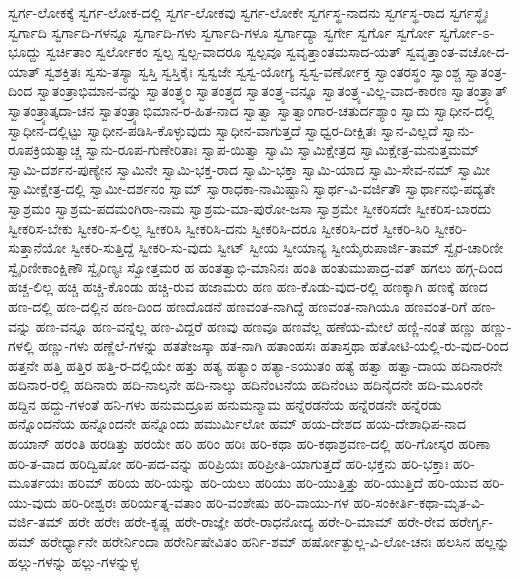 {ಸ್ವರ್ಗ-ಲೋಕಕ್ಕೆ
ಸ್ವರ್ಗ-ಲೋಕ-ದಲ್ಲಿ
ಸ್ವರ್ಗ-ಲೋಕವು
ಸ್ವರ್ಗ-ಲೋಕೇ
ಸ್ವರ್ಗಸ್ಥ-ನಾದನು
ಸ್ವರ್ಗಸ್ಥ-ರಾದ
ಸ್ವರ್ಗಸ್ಥೈಃ
ಸ್ವರ್ಗಾದಿ
ಸ್ವರ್ಗಾದಿ-ಗಳನ್ನೂ
ಸ್ವರ್ಗಾದಿ-ಗಳು
ಸ್ವರ್ಗಾದಿ-ಗಳೂ
ಸ್ವರ್ಗಾದ್ಯಾ
ಸ್ವರ್ಗೇ
ಸ್ವರ್ಗೊ
ಸ್ವರ್ಗೋ
ಸ್ವರ್ಗೋ-ಽ-ಭೂದ್ದು
ಸ್ವರ್ಚಿತಾಂ
ಸ್ವರ್ಲೋಕಂ
ಸ್ವಲ್ಪ
ಸ್ವಲ್ಪ-ವಾದರೂ
ಸ್ವಲ್ಪವೂ
ಸ್ವವೃತ್ತಾಂತಮಸಾದ-ಯತ್
ಸ್ವವೃತ್ತಾಂತ-ವಚೋ-ದ-ಯಾತ್
ಸ್ವಶಕ್ತಿತಃ
ಸ್ವಸು-ತಸ್ಯಾ
ಸ್ವಸ್ತಿ
ಸ್ವಸ್ತಿಕೈಃ
ಸ್ವಸ್ವಜೇ
ಸ್ವಸ್ವ-ಯೋಗ್ಯ
ಸ್ವಸ್ವ-ವರ್ಣೋಕ್ತ
ಸ್ವಾಂತರಸ್ಥಂ
ಸ್ವಾಂಶ್ಚ
ಸ್ವಾತಂತ್ರ-ದಿಂದ
ಸ್ವಾತಂತ್ರಾಭಿಮಾನ-ವನ್ನು
ಸ್ವಾತಂತ್ರ್ಯಂ
ಸ್ವಾತಂತ್ರ್ಯದ
ಸ್ವಾತಂತ್ರ್ಯ-ವನ್ನೂ
ಸ್ವಾತಂತ್ರ್ಯ-ವಿಲ್ಲ-ವಾದ-ಕಾರಣ
ಸ್ವಾತಂತ್ರ್ಯಾತ್
ಸ್ವಾತಂತ್ರ್ಯಾತ್ಕದಾ-ಚನ
ಸ್ವಾತಂತ್ರ್ಯಾಭಿಮಾನ-ರ-ಹಿತ-ನಾದ
ಸ್ವಾತ್ವಾ
ಸ್ವಾತ್ವಾಂಗಾರ-ಚತುರ್ದಶ್ಯಾಂ
ಸ್ವಾದು
ಸ್ವಾಧೀನ-ದಲ್ಲಿ
ಸ್ವಾಧೀನ-ದಲ್ಲಿಟ್ಟು
ಸ್ವಾಧೀನ-ಪಡಿಸಿ-ಕೊಳ್ಳುವುದು
ಸ್ವಾಧೀನ-ವಾಗುತ್ತದೆ
ಸ್ವಾಧ್ವರ-ದೀಕ್ಷಿತಃ
ಸ್ವಾನ-ವಿಲ್ಲದೆ
ಸ್ವಾನು-ರೂಪಕ್ರಿಯತ್ವಾಚ್ಚ
ಸ್ವಾನು-ರೂಪ-ಗುಣೇರಿತಾಃ
ಸ್ವಾಪ-ಯಿತ್ವಾ
ಸ್ವಾಮಿ
ಸ್ವಾಮಿಕ್ಷೇತ್ರದ
ಸ್ವಾಮಿಕ್ಷೇತ್ರ-ಮನುತ್ತಮಮ್
ಸ್ವಾಮಿ-ದರ್ಶನ-ಪುಣ್ಯೇನ
ಸ್ವಾಮಿನೇ
ಸ್ವಾಮಿ-ಭಕ್ತ-ರಾದ
ಸ್ವಾಮಿ-ಭಕ್ತಾ
ಸ್ವಾಮಿ-ಯಾದ
ಸ್ವಾಮಿ-ಸೇವ-ನಮ್
ಸ್ವಾಮೀ
ಸ್ವಾಮೀಕ್ಷೇತ್ರ-ದಲ್ಲಿ
ಸ್ವಾಮೀ-ದರ್ಶನಂ
ಸ್ವಾಮ್
ಸ್ವಾರಾಧಕಾ-ನಾಮಿಷ್ಟಾನಿ
ಸ್ವಾರ್ಥ-ವಿ-ವರ್ಜಿತೌ
ಸ್ವಾರ್ಥಾನಭಿ-ಪದ್ಯತೇ
ಸ್ವಾಶ್ರಮಂ
ಸ್ವಾಶ್ರಮ-ಪದಮಂಗಿರಾ-ನಾಮ
ಸ್ವಾಶ್ರಮ-ಮಾ-ಪುರೋ-ಜಸಾ
ಸ್ವಾಶ್ರಮೇ
ಸ್ವೀಕರಿಸದೇ
ಸ್ವೀಕರಿಸ-ಬಾರದು
ಸ್ವೀಕರಿಸ-ಬೇಕು
ಸ್ವೀಕರಿ-ಸ-ಲಿಲ್ಲ
ಸ್ವೀಕರಿಸಿ
ಸ್ವೀಕರಿಸಿ-ದನು
ಸ್ವೀಕರಿಸಿ-ದರೂ
ಸ್ವೀಕರಿಸಿ-ದರೆ
ಸ್ವೀಕರಿ-ಸಿರಿ
ಸ್ವೀಕರಿ-ಸುತ್ತಾನೆಯೋ
ಸ್ವೀಕರಿ-ಸುತ್ತಿದ್ದೆ
ಸ್ವೀಕರಿ-ಸು-ವುದು
ಸ್ವೀಟ್
ಸ್ವೀಯ
ಸ್ವೀಯಾನ್ಯ
ಸ್ವೀಯೈರುಪಾರ್ಜಿ-ತಾಮ್
ಸ್ವೈರ-ಚಾರಿಣೀ
ಸ್ವೈರಿಣೀಕಾಂಕ್ಷಿಣೌ
ಸ್ವೈರಿಣ್ಯಃ
ಸ್ವೋತ್ತಮರ
ಹ
ಹಂತತ್ವಾಭಿ-ಮಾನಿನಃ
ಹಂತಿ
ಹಂತುಮುಪಾದ್ರ-ವತ್
ಹಗಲು
ಹಗ್ಗ-ದಿಂದ
ಹಚ್ಚ-ಲಿಲ್ಲ
ಹಚ್ಚಿ
ಹಚ್ಚಿ-ಕೊಂಡು
ಹಚ್ಚಿ-ರುವ
ಹಜಾಮರು
ಹಣ
ಹಣ-ಕೊಡು-ವುದ-ರಲ್ಲಿ
ಹಣಕ್ಕಾಗಿ
ಹಣಕ್ಕೆ
ಹಣದ
ಹಣ-ದಲ್ಲಿ
ಹಣ-ದಲ್ಲಿನ
ಹಣ-ದಿಂದ
ಹಣದೊಡನೆ
ಹಣವಂತ-ನಾಗಿದ್ದೆ
ಹಣವಂತ-ನಾಗಿಯೂ
ಹಣವಂತ-ರಿಗೆ
ಹಣ-ವನ್ನು
ಹಣ-ವನ್ನೂ
ಹಣ-ವನ್ನೆಲ್ಲ
ಹಣ-ವಿದ್ದರೆ
ಹಣವು
ಹಣವೂ
ಹಣವೆಲ್ಲ
ಹಣೆಯ-ಮೇಲೆ
ಹಣ್ಣಿ-ನಂತೆ
ಹಣ್ಣು
ಹಣ್ಣು-ಗಳಲ್ಲಿ
ಹಣ್ಣು-ಗಳು
ಹಣ್ಣೆಲೆ-ಗಳನ್ನು
ಹತತೇಜಸ್ಕಾ
ಹತ-ನಾಗಿ
ಹತಾಂಹಸಃ
ಹತಾಸ್ತಥಾ
ಹತೋಟಿ-ಯಲ್ಲಿ-ರು-ವುದ-ರಿಂದ
ಹತ್ತನೇ
ಹತ್ತಿ
ಹತ್ತಿರ
ಹತ್ತಿ-ರ-ದಲ್ಲಿಯೇ
ಹತ್ತು
ಹತ್ಯ
ಹತ್ಯಾಂ
ಹತ್ಯಾ-ಽಯುತಂ
ಹತ್ಯೆ
ಹತ್ವಾ
ಹತ್ವಾ-ದಾಯ
ಹದಿನಾರನೇ
ಹದಿನಾರ-ರಲ್ಲಿ
ಹದಿನಾರು
ಹದಿ-ನಾಲ್ಕನೇ
ಹದಿ-ನಾಲ್ಕು
ಹದಿನೆಂಟನೆಯ
ಹದಿನೆಂಟು
ಹದಿನೈದನೇ
ಹದಿ-ಮೂರನೇ
ಹದ್ದಿನ
ಹದ್ದು-ಗಳಂತೆ
ಹನಿ-ಗಳು
ಹನುಮದ್ರೂಪ
ಹನುಮನ್ಮಾಮ
ಹನ್ನೆರಡನೆಯ
ಹನ್ನೆರಡನೇ
ಹನ್ನೆರಡು
ಹನ್ನೊಂದನೆಯ
ಹನ್ನೊಂದನೇ
ಹನ್ನೊಂದು
ಹಮುರ್ಮಿಲೋ
ಹಮ್
ಹಯ-ದೇಶದ
ಹಯ-ದೇಶಾಧಿಪ-ನಾದ
ಹಯಾನ್
ಹರಂತಿ
ಹರಡಿತ್ತು
ಹರಯೇ
ಹರಿ
ಹರಿಂ
ಹರಿಃ
ಹರಿ-ಕಥಾ
ಹರಿ-ಕಥಾಶ್ರವಣ-ದಲ್ಲಿ
ಹರಿ-ಗೋಸ್ಕರ
ಹರಿಣಾ
ಹರಿ-ತ-ವಾದ
ಹರಿದ್ವಿಷೋ
ಹರಿ-ಪದ-ವನ್ನು
ಹರಿಪ್ರಿಯಃ
ಹರಿಪ್ರೀತಿ-ಯಾಗುತ್ತದೆ
ಹರಿ-ಭಕ್ತನು
ಹರಿ-ಭಕ್ತಾಃ
ಹರಿ-ಮೂರ್ತಯಃ
ಹರಿಮ್
ಹರಿಯ
ಹರಿ-ಯನ್ನು
ಹರಿ-ಯಲು
ಹರಿಯು
ಹರಿ-ಯುತ್ತಿತ್ತು
ಹರಿ-ಯುತ್ತಿದೆ
ಹರಿ-ಯುವ
ಹರಿ-ಯು-ವುದು
ಹರಿ-ರೀಶ್ವರಃ
ಹರಿರ್ಯತ್ನ-ವತಾಂ
ಹರಿ-ವಂಶೇಷು
ಹರಿ-ವಾಯು-ಗಳ
ಹರಿ-ಸಂಕೀರ್ತಿ-ಕಥಾ-ಮೃತ-ವಿ-ವರ್ಜಿ-ತಮ್
ಹರೇ
ಹರೇಃ
ಹರೇ-ಕೃಷ್ಣ
ಹರೇ-ರಾಜ್ಞೇ
ಹರೇ-ರಾಧನೋದ್ಯ
ಹರೇ-ರಿ-ಮಾಮ್
ಹರೇ-ರೇವ
ಹರೇರ್ಗೃ-ಹಮ್
ಹರೇರ್ಧ್ಯಾನೇ
ಹರೇರ್ನಿಂದಾ
ಹರೇರ್ನಿಷೇವಿತಂ
ಹರ್ನಿ-ಶಮ್
ಹರ್ಷೋತ್ಫುಲ್ಲ-ವಿ-ಲೋ-ಚನಃ
ಹಲಸಿನ
ಹಲ್ಲನ್ನು
ಹಲ್ಲು-ಗಳನ್ನು
ಹಲ್ಲು-ಗಳನ್ನುಳ್ಳ
}
